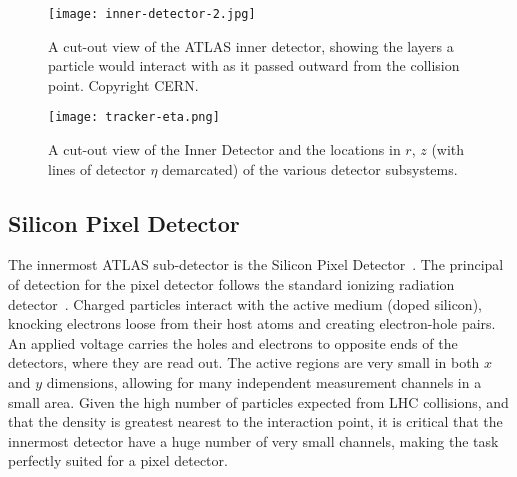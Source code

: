

\begin{figure}
\centering
\texttt{[image: inner-detector-2.jpg]}
\label{fig:detector:inner-detector-2}
\caption{A cut-out view of the ATLAS inner detector, showing the layers a particle would interact with as it passed outward from the collision point. Copyright CERN.}
\end{figure}



\begin{figure}
\centering
\texttt{[image: tracker-eta.png]}
\label{fig:detector:inner-detector-3}
\caption{A cut-out view of the Inner Detector and the locations in $r$, $z$ (with lines of detector $\eta$ demarcated) of the various detector subsystems.}
\end{figure}



\subsection{Silicon Pixel Detector}

The innermost ATLAS sub-detector is the Silicon Pixel Detector~\cite{Pixel,ATLASPaper}. The principal of detection for the pixel detector follows the standard ionizing radiation detector~\cite{Detectors}. Charged particles interact with the active medium (doped silicon), knocking electrons loose from their host atoms and creating electron-hole pairs. An applied voltage carries the holes and electrons to opposite ends of the detectors, where they are read out. The active regions are very small in both $x$ and $y$ dimensions, allowing for many independent measurement channels in a small area. Given the high number of particles expected from LHC collisions, and that the density is greatest nearest to the interaction point, it is critical that the innermost detector have a huge number of very small channels, making the task perfectly suited for a pixel detector.

